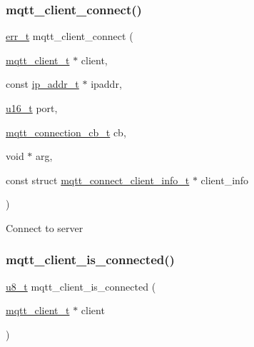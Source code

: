 \subsubsection{\texorpdfstring{mqtt\+\_\+client\+\_\+connect()}{mqtt\_client\_connect()}}
{\footnotesize\ttfamily \hyperlink{group__infrastructure__errors_gaf02d9da80fd66b4f986d2c53d7231ddb}{err\+\_\+t} mqtt\+\_\+client\+\_\+connect (\begin{DoxyParamCaption}\item[{\hyperlink{structmqtt__client__t}{mqtt\+\_\+client\+\_\+t} $\ast$}]{client,  }\item[{const \hyperlink{native_2lwip_2src_2include_2lwip_2ip__addr_8h_a88b43639738c4de2d3cd22e3a1fd7696}{ip\+\_\+addr\+\_\+t} $\ast$}]{ipaddr,  }\item[{\hyperlink{group__compiler__abstraction_ga77570ac4fcab86864fa1916e55676da2}{u16\+\_\+t}}]{port,  }\item[{\hyperlink{group__mqtt_ga8558743bdb7d599a93844fbc56c9029f}{mqtt\+\_\+connection\+\_\+cb\+\_\+t}}]{cb,  }\item[{void $\ast$}]{arg,  }\item[{const struct \hyperlink{structmqtt__connect__client__info__t}{mqtt\+\_\+connect\+\_\+client\+\_\+info\+\_\+t} $\ast$}]{client\+\_\+info }\end{DoxyParamCaption})}

Connect to server \mbox{\label{openmote-cc2538_2lwip_2src_2include_2lwip_2apps_2mqtt_8h_a98f0fd168112b8b7db59bcd7a325a5c5}} 
\subsubsection{\texorpdfstring{mqtt\+\_\+client\+\_\+is\+\_\+connected()}{mqtt\_client\_is\_connected()}}
{\footnotesize\ttfamily \hyperlink{group__compiler__abstraction_ga4caecabca98b43919dd11be1c0d4cd8e}{u8\+\_\+t} mqtt\+\_\+client\+\_\+is\+\_\+connected (\begin{DoxyParamCaption}\item[{\hyperlink{structmqtt__client__t}{mqtt\+\_\+client\+\_\+t} $\ast$}]{client }\end{DoxyParamCaption})}


